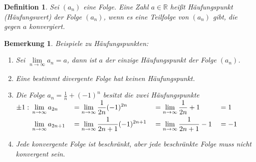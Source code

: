 \documentclass[a4paper,titlepage,oneside]{article}
\def\R{\ensuremath{\mathbb{R}} }
\renewcommand{\liminf}[2][n]{\ensuremath{\lim\limits_{#1 \rightarrow \infty}{#2}}}
\theoremstyle{thmstyle}
\newtheorem{defi}[satz]{Definition}
\newtheorem{bem}[satz]{Bemerkung}
\begin{document}
\begin{defi}
Sei \((a_n)\) eine Folge. Eine Zahl \(a \in \R\) heißt Häufungspunkt (Häufungswert) der Folge \((a_n)\), wenn es eine Teilfolge von \((a_n)\) gibt, die gegen \(a\) konvergiert.
\end{defi}

\begin{bem}
Beispiele zu Häufungspunkten:
\begin{enumerate}
\item Sei \(\liminf{a_n} = a\), dann ist \(a\) der einzige Häufungspunkt der Folge \((a_n)\).
\item Eine bestimmt divergente Folge hat keinen Häufungspunkt.
\item Die Folge $ \displaystyle a_n = \frac{1}{n}+ (-1)^n $ besitzt die zwei Häufungspunkte $ \displaystyle \pm 1:\\
\begin{aligned}[t] &\liminf{a_{2n}} &&= \liminf{\frac{1}{2n} (-1)^{2n}} &&= \liminf{\frac{1}{2n}} + 1 &&= 1 \\
&\liminf{a_{2n+1}} &&= \liminf{\frac{1}{2n+1} (-1)^{2n+1}} &&= \liminf{\frac{1}{2n+1}} - 1 &&= - 1
\end{aligned}$
\item Jede konvergente Folge ist beschränkt, aber jede beschränkte Folge muss nicht konvergent sein.
\end{enumerate}
\end{bem}
\end{document}
